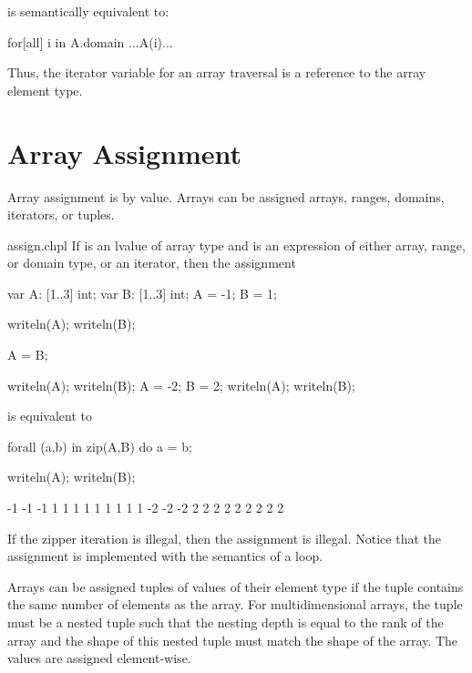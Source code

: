 is semantically equivalent to:

\begin{chapel}
[co]for[all] i in A.domain
  ...A(i)...
\end{chapel}

Thus, the iterator variable for an array traversal is a reference to
the array element type.


\section{Array Assignment}
\label{Array_Assignment}

Array assignment is by value.  Arrays can be assigned arrays, ranges,
domains, iterators, or tuples.

\begin{chapelexample}{assign.chpl}
If  is an lvalue of array type and  is an expression
of either array, range, or domain type, or an iterator, then the
assignment
\begin{chapelpre}
var A: [1..3] int;
var B: [1..3] int;
A = -1;
B = 1;
\end{chapelpre}
\begin{chapelnoprint}
writeln(A);
writeln(B);
\end{chapelnoprint}
\begin{chapel}
A = B;
\end{chapel}
\begin{chapelnoprint}
writeln(A);
writeln(B);
A = -2;
B = 2;
writeln(A);
writeln(B);
\end{chapelnoprint}
is equivalent to
\begin{chapel}
forall (a,b) in zip(A,B) do
  a = b;
\end{chapel}
\begin{chapelpost}
writeln(A);
writeln(B);
\end{chapelpost}
\begin{chapeloutput}
-1 -1 -1
1 1 1
1 1 1
1 1 1
-2 -2 -2
2 2 2
2 2 2
2 2 2
\end{chapeloutput}
If the zipper iteration is illegal, then the assignment is illegal.
Notice that the assignment is implemented with the semantics of
a  loop.
\end{chapelexample}

Arrays can be assigned tuples of values of their element type if the
tuple contains the same number of elements as the array.  For
multidimensional arrays, the tuple must be a nested tuple such that
the nesting depth is equal to the rank of the array and the shape of
this nested tuple must match the shape of the array.  The values are
assigned element-wise.

